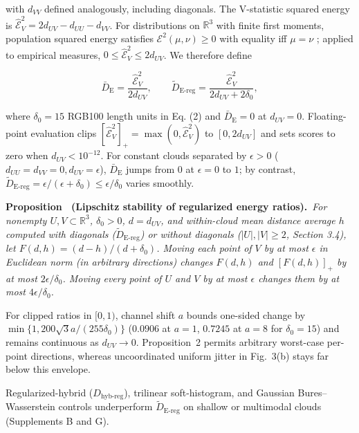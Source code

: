 \documentclass[10pt,journal,compsoc]{IEEEtran}
\newcounter{proposition}
\newenvironment{proposition}[1][]{\refstepcounter{proposition}\par\smallskip\noindent\textbf{Proposition \theproposition\ (#1).}\ }{\par\smallskip}
\newcommand{\Denergy}{\bar D_{\mathrm E}}
\newcommand{\Dereg}{\tilde D_{\mathrm{E\mbox{-}reg}}}
\newcommand{\Dhybreg}{D_{\mathrm{hyb\mbox{-}reg}}}
\begin{document}
\noindent with $d_{VV}$ defined analogously, including diagonals. The V-statistic squared energy is $\widehat{\mathcal E}_V^2=2d_{UV}-d_{UU}-d_{VV}$. For distributions on $\mathbb R^3$ with finite first moments, population squared energy satisfies $\mathcal E^2(\mu,\nu)\ge 0$ with equality iff $\mu=\nu$ \cite{ref27,ref28}; applied to empirical measures, $0\le\widehat{\mathcal E}_V^2\le 2d_{UV}$. We therefore define


\begin{equation}
\Denergy{}=\frac{\widehat{\mathcal E}_V^2}{2d_{UV}},\qquad\Dereg{}=\frac{\widehat{\mathcal E}_V^2}{2d_{UV}+2\delta_0},
\end{equation}

\noindent where $\delta_0=15$ RGB100 length units in Eq. (2) and $\Denergy{}=0$ at $d_{UV}=0$. Floating-point evaluation clips $[\widehat{\mathcal E}_V^2]_+=\max(0,\widehat{\mathcal E}_V^2)$ to $[0,2d_{UV}]$ and sets scores to zero when $d_{UV}<10^{-12}$. For constant clouds separated by $\epsilon>0$ ($d_{UU}=d_{VV}=0, d_{UV}=\epsilon$), $\Denergy{}$ jumps from $0$ at $\epsilon=0$ to $1$; by contrast, $\Dereg{}=\epsilon/(\epsilon+\delta_0)\le\epsilon/\delta_0$ varies smoothly.


\begin{proposition}[Lipschitz stability of regularized energy ratios]\label{prop:2}\normalfont \emph{For nonempty $U,V\subset\mathbb R^3$, $\delta_0>0$, $d=d_{UV}$, and within-cloud mean distance average $h$ computed with diagonals ($\Dereg{}$) or without diagonals ($|U|,|V|\ge 2$, Section 3.4), let $F(d,h)=(d-h)/(d+\delta_0)$. Moving each point of $V$ by at most $\epsilon$ in Euclidean norm (in arbitrary directions) changes $F(d,h)$ and $[F(d,h)]_+$ by at most $2\epsilon/\delta_0$. Moving every point of $U$ and $V$ by at most $\epsilon$ changes them by at most $4\epsilon/\delta_0$.}


\end{proposition}

For clipped ratios in $[0,1)$, channel shift $a$ bounds one-sided change by $\min\{1, 200\sqrt{3}a/(255\delta_0)\}$ ($0.0906$ at $a=1$, $0.7245$ at $a=8$ for $\delta_0=15$) and remains continuous as $d_{UV}\to 0$. Proposition~2 permits arbitrary worst-case per-point directions, whereas uncoordinated uniform jitter in Fig.~3(b) stays far below this envelope.

Regularized-hybrid ($\Dhybreg{}$), trilinear soft-histogram, and Gaussian Bures--Wasserstein \cite{ref29} controls underperform $\Dereg{}$ on shallow or multimodal clouds (Supplements B and G).
\end{document}
